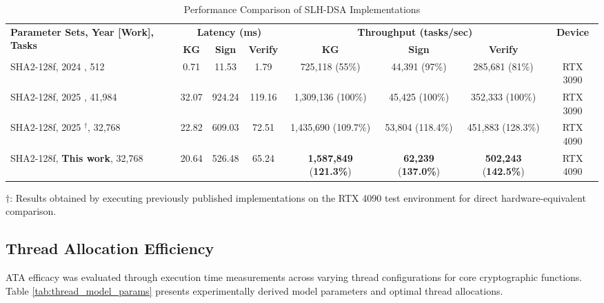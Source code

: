 \documentclass[journal]{IEEEtran}
\begin{document}
\begin{table*}[htpb]
  \centering
  \caption{Performance Comparison of SLH-DSA Implementations}
  \label{tab:comparative_perf}
  \begin{tabular}{@{}lccccccc@{}}
    \toprule
    \multirow{2}{*}{\textbf{Parameter Sets, Year [Work], Tasks}} & \multicolumn{3}{c}{\textbf{Latency (ms)}} & \multicolumn{3}{c}{\textbf{Throughput (tasks/sec)}} & \multirow{2}{*}{\textbf{Device}} \\
    \cmidrule(lr){2-4} \cmidrule(lr){5-7}
    & \textbf{KG} & \textbf{Sign} & \textbf{Verify} & \textbf{KG} & \textbf{Sign} & \textbf{Verify} & \\
    \midrule
    SHA2-128f, 2024 \cite{Kim2024}, 512  & 0.71 & 11.53 & 1.79 & 725,118 (55\%) & 44,391 (97\%) & 285,681 (81\%) & RTX 3090 \\
    SHA2-128f, 2025 \cite{Wang2025}, 41,984 & 32.07 & 924.24 & 119.16 & 1,309,136 (100\%) & 45,425 (100\%) & 352,333 (100\%) & RTX 3090 \\
    SHA2-128f, 2025 \cite{Wang2025}$^\dagger$, 32,768 & 22.82 & 609.03 & 72.51 & 1,435,690 (109.7\%) & 53,804 (118.4\%) & 451,883 (128.3\%) & RTX 4090 \\
    SHA2-128f, \textbf{This work}, 32,768 & 20.64 & 526.48 & 65.24 & \textbf{1,587,849} (\textbf{121.3\%}) & \textbf{62,239} (\textbf{137.0\%}) & \textbf{502,243} (\textbf{142.5\%}) & RTX 4090 \\
    \bottomrule
  \end{tabular}
  \begin{tablenotes}
  \item[] $\dagger$: Results obtained by executing previously published implementations on the RTX 4090 test environment for direct hardware-equivalent comparison.
  \end{tablenotes}
\end{table*}

\subsection{Thread Allocation Efficiency}

ATA efficacy was evaluated through execution time measurements across varying thread configurations for core cryptographic functions. Table \ref{tab:thread_model_params} presents experimentally derived model parameters and optimal thread allocations.
\end{document}
